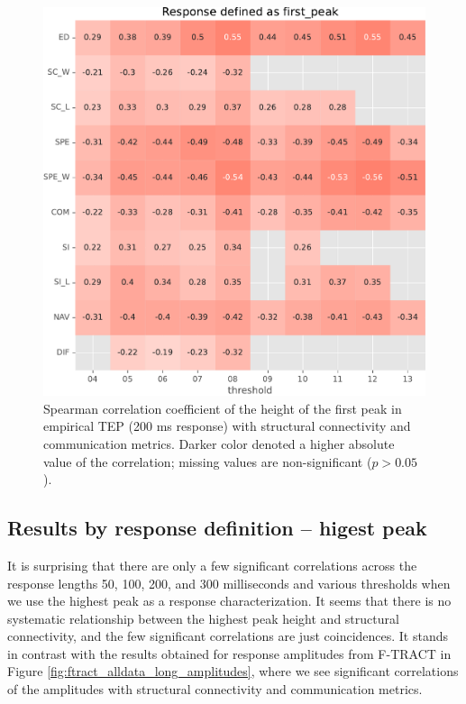 
\begin{figure}
    \centering
    \includegraphics[width=\textwidth]{images/nootebook_generated/pytepfit_results/empirical/200/not_over_threshold_nan/Response defined as first_peak.pdf}
    \caption[TEPs first peak (200 ms) correlations]{Spearman correlation coefficient of the height of the first peak in empirical TEP (200 ms response) with structural connectivity and communication metrics. Darker color denoted a higher absolute value of the correlation; missing values are non-significant ($p>0.05$).}
    \label{fig:tms_first_200}
\end{figure}

\subsection{Results by response definition -- higest peak}

It is surprising that there are only a few significant correlations across the response lengths 50, 100, 200, and 300 milliseconds and various thresholds when we use the highest peak as a response characterization. It seems that there is no systematic relationship between the highest peak height and structural connectivity, and the few significant correlations are just coincidences. It stands in contrast with the results obtained for response amplitudes from F-TRACT in Figure \ref{fig:ftract_alldata_long_amplitudes}, where we see significant correlations of the amplitudes with structural connectivity and communication metrics.

